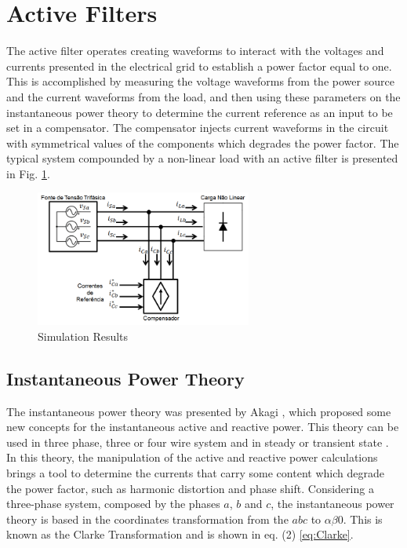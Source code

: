 \section{Active Filters}

The active filter operates creating waveforms to interact with the voltages and currents presented in the electrical grid to establish a power factor equal to one. This is accomplished by measuring the voltage waveforms from the power source and the current waveforms from the load, and then using these parameters on the instantaneous power theory to determine the current reference as an input to be set in a compensator. The compensator injects current waveforms in the circuit with symmetrical values of the components which degrades the power factor. The typical system compounded by a non-linear load with an active filter is presented in Fig. \ref{fig:compensador.png}.

\begin{figure}[!h]
\centering
\includegraphics[width=2.8in]{Figures/compensador.png}
\caption{Simulation Results}
\label{fig:compensador.png}
\end{figure}



\subsection{Instantaneous Power Theory}

The instantaneous power theory was presented by Akagi \cite{Akagi}, which proposed some new concepts for the instantaneous active and reactive power. This theory can be used in three phase, three or four wire system and in steady or transient state \cite{Akagi,Akagi}. In this theory, the manipulation of the active and reactive power calculations brings a tool to determine the currents that carry some content which degrade the power factor, such as harmonic distortion and phase shift.
Considering a three-phase system, composed by the phases $a$, $b$ and $c$, the instantaneous power theory is based in the coordinates transformation from the $abc$ to $\alpha \beta 0 $. This is known as the Clarke Transformation and is shown in eq. (2) \ref{eq:Clarke}.

